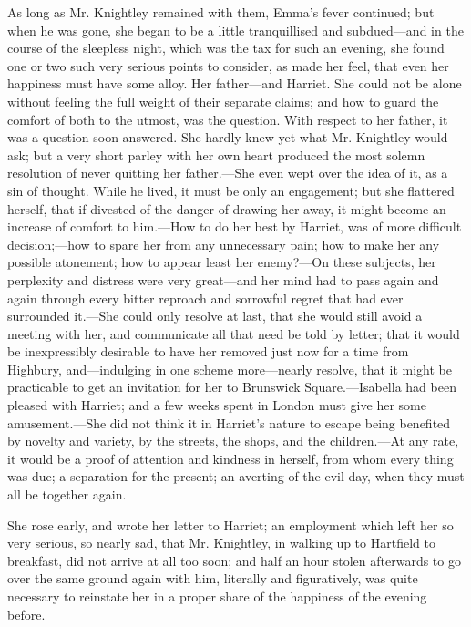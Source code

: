 As long as Mr. Knightley remained with them, Emma's fever continued; but when he was gone, she began to be a little tranquillised and subdued---and in the course of the sleepless night, which was the tax for such an evening, she found one or two such very serious points to consider, as made her feel, that even her happiness must have some alloy. Her father---and Harriet. She could not be alone without feeling the full weight of their separate claims; and how to guard the comfort of both to the utmost, was the question. With respect to her father, it was a question soon answered. She hardly knew yet what Mr. Knightley would ask; but a very short parley with her own heart produced the most solemn resolution of never quitting her father.---She even wept over the idea of it, as a sin of thought. While he lived, it must be only an engagement; but she flattered herself, that if divested of the danger of drawing her away, it might become an increase of comfort to him.---How to do her best by Harriet, was of more difficult decision;---how to spare her from any unnecessary pain; how to make her any possible atonement; how to appear least her enemy?---On these subjects, her perplexity and distress were very great---and her mind had to pass again and again through every bitter reproach and sorrowful regret that had ever surrounded it.---She could only resolve at last, that she would still avoid a meeting with her, and communicate all that need be told by letter; that it would be inexpressibly desirable to have her removed just now for a time from Highbury, and---indulging in one scheme more---nearly resolve, that it might be practicable to get an invitation for her to Brunswick Square.---Isabella had been pleased with Harriet; and a few weeks spent in London must give her some amusement.---She did not think it in Harriet's nature to escape being benefited by novelty and variety, by the streets, the shops, and the children.---At any rate, it would be a proof of attention and kindness in herself, from whom every thing was due; a separation for the present; an averting of the evil day, when they must all be together again.

She rose early, and wrote her letter to Harriet; an employment which left her so very serious, so nearly sad, that Mr. Knightley, in walking up to Hartfield to breakfast, did not arrive at all too soon; and half an hour stolen afterwards to go over the same ground again with him, literally and figuratively, was quite necessary to reinstate her in a proper share of the happiness of the evening before.

